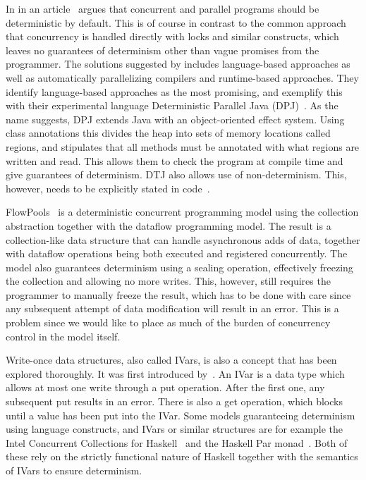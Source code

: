 In in an article~\textcite{detbydefault} argues that concurrent and parallel
programs should be deterministic by default. This is of course in contrast to
the common approach that concurrency is handled directly with locks and similar
constructs, which leaves no guarantees of determinism other than vague promises
from the programmer. The solutions suggested by \textcite{detbydefault} includes
language-based approaches as well as automatically parallelizing compilers and
runtime-based approaches. They identify language-based approaches as the most
promising, and exemplify this with their experimental language Deterministic Parallel
Java (DPJ)~\parencite{detparjava}. As the name suggests, DPJ extends Java with
an object-oriented effect system. Using class annotations this divides the heap
into sets of memory locations called regions, and stipulates that all methods
must be annotated with what regions are written and read. This allows them to
check the program at compile time and give guarantees of determinism. DTJ also
allows use of non-determinism. This, however, needs to be explicitly stated in
code~\parencite{detparjava, dpjthesis}.

FlowPools~\parencite{flowpools} is a deterministic concurrent programming model
using the collection abstraction together with the dataflow programming model.
The result is a collection-like data structure that can handle asynchronous adds
of data, together with dataflow operations being both executed and registered
concurrently. The model also guarantees determinism using a sealing operation,
effectively freezing the collection and allowing no more writes.  This, however,
still requires the programmer to manually freeze the result, which has to be
done with care since any subsequent attempt of data modification will result in
an error. This is a problem since we would like to place as much of the burden
of concurrency control in the model itself.

Write-once data structures, also called IVars, is also a concept that has been
explored thoroughly. It was first introduced by~\textcite{nikhil1989structures}.
An IVar is a data type which allows at most one write through a put operation.
After the first one, any subsequent put results in an error. There is also a get
operation, which blocks until a value has been put into the IVar. Some models
guaranteeing determinism using language constructs, and IVars or similar
structures are for example the Intel Concurrent Collections for
Haskell~\parencite{icnch} and the Haskell Par monad~\parencite{hpm}. Both of
these rely on the strictly functional nature of Haskell together with the semantics of
IVars to ensure determinism.


